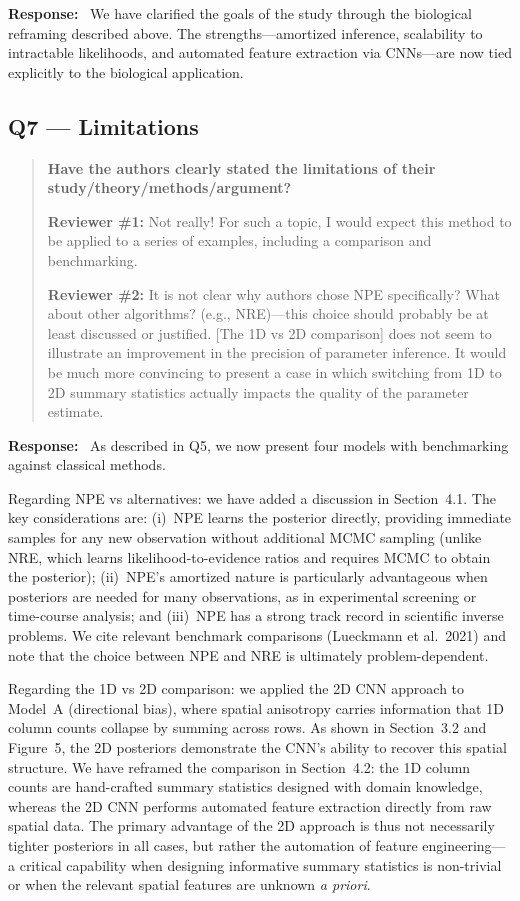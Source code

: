 \documentclass[11pt,a4paper]{article}
\newenvironment{reviewercomment}{%
  \begin{quote}\itshape\color{reviewerblue}%
}{%
  \end{quote}%
}
\newcommand{\response}{\textbf{Response:}~}
\begin{document}
\response
We have clarified the goals of the study through the biological reframing described above. The strengths---amortized inference, scalability to intractable likelihoods, and automated feature extraction via CNNs---are now tied explicitly to the biological application.


\subsection*{Q7 --- Limitations}

\begin{reviewercomment}
\textbf{Have the authors clearly stated the limitations of their study/theory/methods/argument?}

\textbf{Reviewer \#1:} Not really! For such a topic, I would expect this method to be applied to a series of examples, including a comparison and benchmarking.

\textbf{Reviewer \#2:} It is not clear why authors chose NPE specifically? What about other algorithms? (e.g., NRE)---this choice should probably be at least discussed or justified. [The 1D vs 2D comparison] does not seem to illustrate an improvement in the precision of parameter inference. It would be much more convincing to present a case in which switching from 1D to 2D summary statistics actually impacts the quality of the parameter estimate.
\end{reviewercomment}

\response
As described in Q5, we now present four models with benchmarking against classical methods.

Regarding NPE vs alternatives: we have added a discussion in Section~4.1. The key considerations are: (i)~NPE learns the posterior directly, providing immediate samples for any new observation without additional MCMC sampling (unlike NRE, which learns likelihood-to-evidence ratios and requires MCMC to obtain the posterior); (ii)~NPE's amortized nature is particularly advantageous when posteriors are needed for many observations, as in experimental screening or time-course analysis; and (iii)~NPE has a strong track record in scientific inverse problems. We cite relevant benchmark comparisons (Lueckmann et al.\ 2021) and note that the choice between NPE and NRE is ultimately problem-dependent.

Regarding the 1D vs 2D comparison: we applied the 2D CNN approach to Model~A (directional bias), where spatial anisotropy carries information that 1D column counts collapse by summing across rows. As shown in Section~3.2 and Figure~5, the 2D posteriors demonstrate the CNN's ability to recover this spatial structure. We have reframed the comparison in Section~4.2: the 1D column counts are hand-crafted summary statistics designed with domain knowledge, whereas the 2D CNN performs automated feature extraction directly from raw spatial data. The primary advantage of the 2D approach is thus not necessarily tighter posteriors in all cases, but rather the automation of feature engineering---a critical capability when designing informative summary statistics is non-trivial or when the relevant spatial features are unknown \emph{a priori}.
\end{document}
